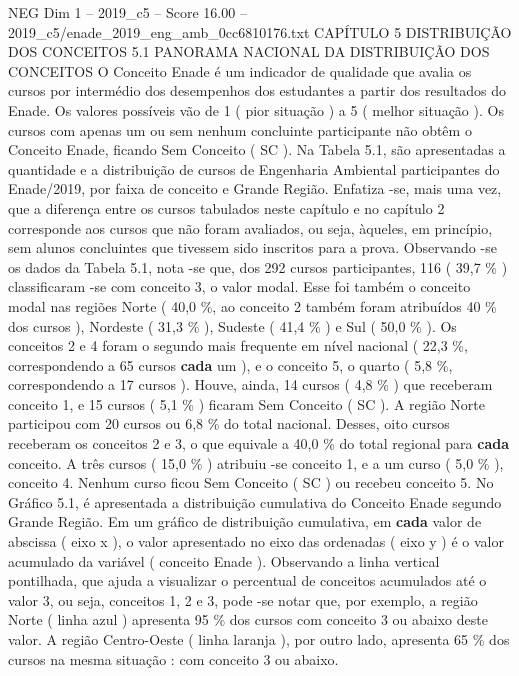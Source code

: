 \begin{textsample}{NEG Dim 1 – 2019\_c5 – Score 16.00 – 2019\_c5/enade\_2019\_eng\_amb\_0cc6810176.txt}  \label{ex:f1_neg_396}
CAPÍTULO 5 DISTRIBUIÇÃO DOS CONCEITOS 5.1 PANORAMA NACIONAL DA DISTRIBUIÇÃO DOS CONCEITOS O Conceito Enade é um indicador de qualidade que avalia os cursos por intermédio dos desempenhos dos estudantes a partir dos resultados do Enade.
Os valores possíveis vão de 1 ( pior situação ) a 5 ( melhor situação ).
Os cursos com apenas um ou sem nenhum concluinte participante não obtêm o Conceito Enade, ficando Sem Conceito ( SC ).
Na Tabela 5.1, são apresentadas a quantidade e a distribuição de cursos de Engenharia Ambiental participantes do Enade/2019, por faixa de conceito e Grande Região.
Enfatiza -se, mais uma vez, que a diferença entre os cursos tabulados neste capítulo e no capítulo 2 corresponde aos cursos que não foram avaliados, ou seja, àqueles, em princípio, sem alunos concluintes que tivessem sido inscritos para a prova.
Observando -se os dados da Tabela 5.1, nota -se que, dos 292 cursos participantes, 116 ( 39,7 \% ) classificaram -se com conceito 3, o valor modal.
Esse foi também o conceito modal nas regiões Norte ( 40,0 \%, ao conceito 2 também foram atribuídos 40 \% dos cursos ), Nordeste ( 31,3 \% ), Sudeste ( 41,4 \% ) e Sul ( 50,0 \% ).
Os conceitos 2 e 4 foram o segundo mais frequente em nível nacional ( 22,3 \%, correspondendo a 65 cursos \textbf{cada} um ), e o conceito 5, o quarto ( 5,8 \%, correspondendo a 17 cursos ).
Houve, ainda, 14 cursos ( 4,8 \% ) que receberam conceito 1, e 15 cursos ( 5,1 \% ) ficaram Sem Conceito ( SC ).
A região Norte participou com 20 cursos ou 6,8 \% do total nacional.
Desses, oito cursos receberam os conceitos 2 e 3, o que equivale a 40,0 \% do total regional para \textbf{cada} conceito.
A três cursos ( 15,0 \% ) atribuiu -se conceito 1, e a um curso ( 5,0 \% ), conceito 4.
Nenhum curso ficou Sem Conceito ( SC ) ou recebeu conceito 5.
No Gráfico 5.1, é apresentada a distribuição cumulativa do Conceito Enade segundo Grande Região.
Em um gráfico de distribuição cumulativa, em \textbf{cada} valor de abscissa ( eixo x ), o valor apresentado no eixo das ordenadas ( eixo y ) é o valor acumulado da variável ( conceito Enade ).
Observando a linha vertical pontilhada, que ajuda a visualizar o percentual de conceitos acumulados até o valor 3, ou seja, conceitos 1, 2 e 3, pode -se notar que, por exemplo, a região Norte ( linha azul ) apresenta 95 \% dos cursos com conceito 3 ou abaixo deste valor.
A região Centro-Oeste ( linha laranja ), por outro lado, apresenta 65 \% dos cursos na mesma situação : com conceito 3 ou abaixo.

\end{textsample}
